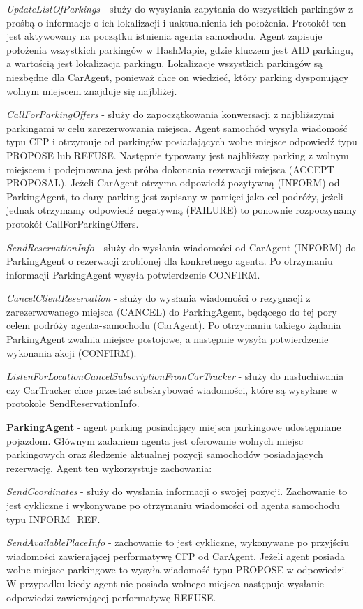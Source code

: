 \textit{UpdateListOfParkings} - służy do  wysyłania zapytania do wszystkich parkingów z prośbą o informacje o ich lokalizacji i uaktualnienia ich położenia. Protokół ten jest aktywowany na początku istnienia agenta samochodu. Agent zapisuje położenia wszystkich parkingów w HashMapie, gdzie kluczem jest AID parkingu, a wartością jest lokalizacja parkingu. Lokalizacje wszystkich parkingów są niezbędne dla CarAgent, ponieważ chce on wiedzieć, który parking dysponujący wolnym miejscem znajduje się najbliżej. 

\textit{CallForParkingOffers} - służy do zapoczątkowania konwersacji z najbliższymi parkingami w celu zarezerwowania miejsca. Agent samochód wysyła wiadomość typu CFP i otrzymuje od parkingów posiadających wolne miejsce odpowiedź typu PROPOSE lub REFUSE. Następnie typowany jest najbliższy parking z wolnym miejscem i podejmowana jest próba dokonania rezerwacji miejsca (ACCEPT PROPOSAL). Jeżeli CarAgent otrzyma odpowiedź pozytywną (INFORM) od ParkingAgent, to dany parking jest zapisany w pamięci jako cel podróży, jeżeli jednak otrzymamy odpowiedź negatywną (FAILURE) to ponownie rozpoczynamy protokół CallForParkingOffers.

\textit{SendReservationInfo} - służy do wysłania wiadomości od CarAgent (INFORM) do ParkingAgent o rezerwacji zrobionej dla konkretnego agenta. Po otrzymaniu informacji ParkingAgent wysyła potwierdzenie CONFIRM.

\textit{CancelClientReservation} - służy do wysłania wiadomości o rezygnacji z zarezerwowanego miejsca (CANCEL) do ParkingAgent, będącego do tej pory celem podróży agenta-samochodu (CarAgent). Po otrzymaniu takiego żądania ParkingAgent zwalnia miejsce postojowe, a następnie wysyła potwierdzenie wykonania akcji (CONFIRM).

\textit{ListenForLocationCancelSubscriptionFromCarTracker} - służy do nasłuchiwania czy CarTracker chce przestać subskrybować wiadomości, które są wysyłane w protokole SendReservationInfo.


\textbf{ParkingAgent} - agent parking posiadający miejsca parkingowe udostępniane pojazdom. Głównym zadaniem agenta jest oferowanie wolnych miejsc parkingowych oraz śledzenie aktualnej pozycji samochodów posiadających rezerwację. Agent ten wykorzystuje zachowania:

\textit{SendCoordinates} - służy do wysłania informacji o swojej pozycji. Zachowanie to jest cykliczne i wykonywane po otrzymaniu wiadomości od agenta samochodu typu INFORM\_REF.

\textit{SendAvailablePlaceInfo} - zachowanie to jest cykliczne, wykonywane po przyjściu wiadomości zawierającej performatywę CFP od CarAgent. Jeżeli agent posiada wolne miejsce parkingowe to wysyła wiadomość typu PROPOSE w odpowiedzi. W przypadku kiedy agent nie posiada wolnego miejsca następuje wysłanie odpowiedzi zawierającej performatywę REFUSE.

